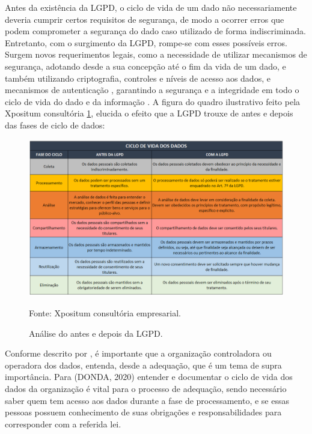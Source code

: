 \documentclass[
	12pt,				%
	openright,			%
	oneside,			%
	a4paper,			%
	english,			%
	french,				%
	spanish,			%
	brazil,				%
	]{abntex2}
\begin{document}
Antes da existência da LGPD, o ciclo de vida de um dado não necessariamente deveria cumprir certos requisitos de segurança, de modo a ocorrer erros que podem comprometer a segurança do dado caso utilizado de forma indiscriminada. Entretanto, com o surgimento da LGPD, rompe-se com esses possíveis erros. Surgem novos requerimentos legais, como a necessidade de utilizar mecanismos de segurança, adotando desde a sua concepção até o fim da vida de um dado, e também utilizando criptografia, controles e níveis de acesso aos dados, e mecanismos de autenticação \cite{Castro2020}, garantindo a segurança e a integridade em todo o ciclo de vida do dado e da informação \cite{Jimene2020}.
A figura do quadro ilustrativo feito pela Xpositum consultória \ref{fig: 02CicloDeVida}, elucida o efeito que a LGPD trouxe de antes e depois das fases de ciclo de dados:
\begin{figure}[ht]
    \centering
    \caption{Análise do antes e depois da LGPD.}
    \includegraphics[width=6.2in]{Images/02CicloDeVida.png}
    \label{fig: 02CicloDeVida}
    
     \centering \small Fonte: Xpositum consultória empresarial.
    
\end{figure}


Conforme descrito por , é importante que a organização controladora ou operadora dos dados, entenda, desde a adequação, que é um tema de supra importância. Para (DONDA, 2020) entender e documentar o ciclo de vida dos dados da organização é vital para o processo de adequação, sendo necessário saber quem tem acesso aos dados durante a fase de processamento, e se essas pessoas possuem conhecimento de suas obrigações e responsabilidades para corresponder com a referida lei.
\end{document}
